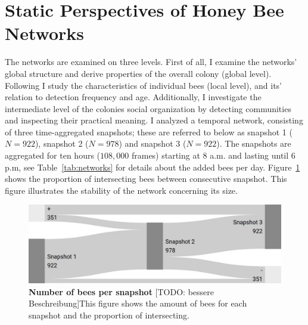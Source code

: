 \section{Static Perspectives of Honey Bee Networks}
The networks are examined on three levels. First of all, I examine the networks’ global structure and derive properties of the overall colony (global level). Following I study the characteristics of individual bees (local level), and its’ relation to detection
frequency and age. Additionally, I investigate the intermediate level of the colonies social organization by detecting communities and inspecting their practical meaning.
I analyzed a temporal network, consisting of three time-aggregated snapshots; these are referred to below as snapshot 1 ($N = 922$), snapshot 2 ($N = 978$) and snapshot 3 ($N = 922$). The snapshots are aggregated for ten hours ($108,000$ frames) starting at 8 a.m. and lasting until 6 p.m, see Table~\ref{tab:networks} for details about the added
bees per day. Figure~\ref{fig:network-matching} shows the proportion of intersecting bees between consecutive snapshot. This figure illustrates the stability of the network concerning its
size.




\begin{figure}[htb]
	\centering
	\includegraphics[width=1.0\textwidth]{Figures/network_matching}
	\caption[Number of bees per snapshot]{\textbf{Number of bees per snapshot} [TODO: bessere Beschreibung]This figure shows the amount of bees for each snapshot and the proportion of intersecting.}
	\label{fig:network-matching}
\end{figure}





